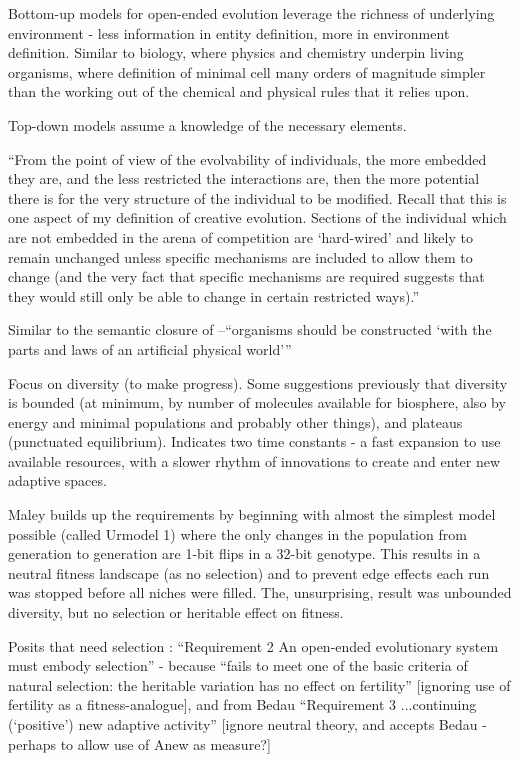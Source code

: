 Bottom-up models for open-ended evolution leverage the richness of underlying environment - less information in entity definition, more in environment definition. Similar to biology, where physics and chemistry underpin living organisms, where definition of minimal cell many orders of magnitude simpler than the working out of the chemical and physical rules that it relies upon.

Top-down models assume a knowledge of the necessary elements.

``From the point of view of the evolvability of individuals, the more embedded they are, and the less restricted the interactions are, then the more potential there is for the very structure of the individual to be modified. Recall that this is one aspect of my definition of creative evolution. Sections of the individual which are not embedded in the arena of competition are `hard-wired' and
likely to remain unchanged unless specific mechanisms are included to allow them to change (and the very fact that specific mechanisms are required suggests that they would still only be able to change in certain restricted ways).'' \cite{Taylor2001}

Similar to the semantic closure of \cite{Pattee1995a}--``organisms should be constructed `with the parts and laws of an artificial physical world''' \cite{Taylor2001}

\autocite{Maley1999}

Focus on diversity (to make progress). Some suggestions previously that diversity is bounded (at minimum, by
number of molecules available for biosphere, also by energy and
minimal populations and probably other things), and plateaus
(punctuated equilibrium). Indicates two time constants - a fast expansion to use available resources, with a slower rhythm of innovations to create and enter new adaptive spaces.

Maley builds up the requirements by beginning with almost the simplest model possible (called Urmodel 1) where the only changes in the population from generation to generation are 1-bit flips in a 32-bit genotype. This results in a neutral fitness landscape (as no selection) and to prevent edge effects each run was stopped before all niches were filled. The, unsurprising, result was unbounded diversity, but no selection or heritable effect on fitness.

Posits that need selection : ``Requirement 2 An open-ended
evolutionary system must embody selection'' - because ``fails to meet
one of the basic criteria of natural selection: the heritable
variation has no effect on fertility'' {[}ignoring use of fertility as
a fitness-analogue{]}, and from Bedau ``Requirement 3 ...continuing
(`positive') new adaptive activity'' {[}ignore neutral theory, and
accepts Bedau - perhaps to allow use of Anew as measure?{]}

